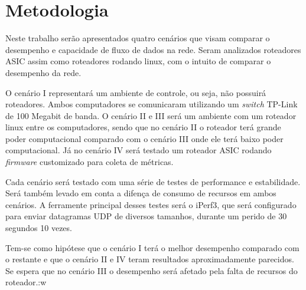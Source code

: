 \section{Metodologia}
Neste trabalho serão apresentados quatro cenários que visam comparar o desempenho e capacidade de fluxo de dados na rede. Seram analizados roteadores \ac{ASIC} assim como roteadores rodando linux, com o intuito de comparar o desempenho da rede. 

O cenário I representará um ambiente de controle, ou seja, não possuirá roteadores. Ambos computadores se comunicaram utilizando um \textit{switch} TP-Link de 100 Megabit de banda. O cenário II e III será um ambiente com um roteador linux entre os computadores, sendo que no cenário II o roteador terá grande poder computacional comparado com o cenário III onde ele terá baixo poder computacional. Já no cenário IV será testado um roteador \ac{ASIC} rodando \textit{firmware} customizado para coleta de métricas.

Cada cenário será testado com uma série de testes de performance e estabilidade. Será também levado em conta a difença de consumo de recursos em ambos cenários. A ferramente principal desses testes será o iPerf3, que será configurado para enviar datagramas UDP de diversos tamanhos, durante um perido de 30 segundos 10 vezes.

Tem-se como hipótese que o cenário I terá o melhor desempenho comparado com o restante e que o cenário II e IV teram resultados aproximadamente parecidos. Se espera que no cenário III o desempenho será afetado pela falta de recursos do roteador.:w

